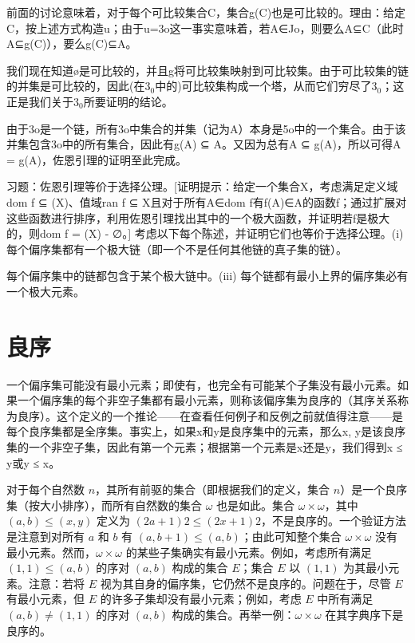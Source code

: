 \documentclass[12pt,a4paper]{ctexbook}
\theoremstyle{definition}
\theoremstyle{remark}
\begin{document}
{前面的讨论意味着，对于每个可比较集合C，集合g(C)也是可比较的。理由：给定C，按上述方式构造u；由于u=3o这一事实意味着，若A∈Jo，则要么A⊆C（此时A⊆g(C)），要么g(C)⊆A。

我们现在知道ø是可比较的，并且g将可比较集映射到可比较集。由于可比较集的链的并集是可比较的，因此(在3$_{0}$中的)可比较集构成一个塔，从而它们穷尽了3$_{0}$；这正是我们关于3$_{0}$所要证明的结论。

由于3o是一个链，所有3o中集合的并集（记为A）本身是5o中的一个集合。由于该并集包含3o中的所有集合，因此有g(A) ⊆ A。又因为总有A ⊆ g(A)，所以可得A = g(A)，佐恩引理的证明至此完成。

习题：佐恩引理等价于选择公理。[证明提示：给定一个集合X，考虑满足定义域dom f ⊆ (X)、值域ran f ⊆ X且对于所有A∈dom f有f(A)∈A的函数f；通过扩展对这些函数进行排序，利用佐恩引理找出其中的一个极大函数，并证明若f是极大的，则dom f = (X) - {∅}。] 考虑以下每个陈述，并证明它们也等价于选择公理。(i) 每个偏序集都有一个极大链（即一个不是任何其他链的真子集的链）。

每个偏序集中的链都包含于某个极大链中。(iii) 每个链都有最小上界的偏序集必有一个极大元素。


\chapter{良序}

一个偏序集可能没有最小元素；即使有，也完全有可能某个子集没有最小元素。如果一个偏序集的每个非空子集都有最小元素，则称该偏序集为良序的（其序关系称为良序）。这个定义的一个推论——在查看任何例子和反例之前就值得注意——是每个良序集都是全序集。事实上，如果x和y是良序集中的元素，那么{x, y}是该良序集的一个非空子集，因此有第一个元素；根据第一个元素是x还是y，我们得到x ≤ y或y ≤ x。

对于每个自然数 \(n\)，其所有前驱的集合（即根据我们的定义，集合 \(n\)）是一个良序集（按大小排序），而所有自然数的集合 \(\omega\) 也是如此。集合 \(\omega \times \omega\)，其中 \((a,b) \leq (x,y)\) 定义为 \((2a+1)2 \leq (2x+1)2\)，不是良序的。一个验证方法是注意到对所有 \(a\) 和 \(b\) 有 \((a,b+1) \leq (a,b)\)；由此可知整个集合 \(\omega \times \omega\) 没有最小元素。然而，\(\omega \times \omega\) 的某些子集确实有最小元素。例如，考虑所有满足 \((1,1) \leq (a,b)\) 的序对 \((a,b)\) 构成的集合 \(E\)；集合 \(E\) 以 \((1,1)\) 为其最小元素。注意：若将 \(E\) 视为其自身的偏序集，它仍然不是良序的。问题在于，尽管 \(E\) 有最小元素，但 \(E\) 的许多子集却没有最小元素；例如，考虑 \(E\) 中所有满足 \((a,b) \neq (1,1)\) 的序对 \((a,b)\) 构成的集合。再举一例：\(\omega \times \omega\) 在其字典序下是良序的。

}
\end{document}
